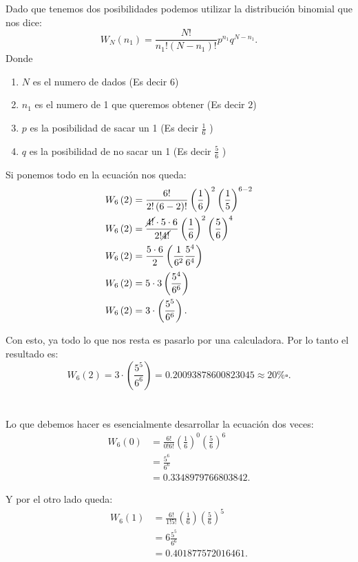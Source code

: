 \documentclass{report}
\begin{document}
Dado que tenemos dos posibilidades podemos utilizar la distribución binomial que nos dice: \[
W_N\left( n_1 \right) = \frac{N!}{n_1!\left( N-n_1 \right)!}p^{n_1}q^{N - n_1}
.\] Donde
\begin{enumerate}
  \item $N$ es el numero de dados (Es decir $6$)
  \item $n_1$ es el numero de 1 que queremos obtener (Es decir $2$)
  \item $p$ es la posibilidad de sacar un 1 (Es decir $\frac{1}{6}$ )
  \item $q$ es la posibilidad de no sacar un 1 (Es decir  $\frac{5}{6}$ )
\end{enumerate}

Si ponemos todo en la ecuación nos queda:
\begin{align*}
  W_6\left( 2 \right) &= \frac{6!}{2!\left( 6 - 2 \right)!}\left( \frac{1}{6} \right) ^{2} \left( \frac{1}{5} \right) ^{6-2} \\
  W_6\left( 2 \right) &= \frac{\cancel{4!}\cdot 5 \cdot 6}{2!\cancel{4!}}\left( \frac{1}{6} \right) ^{2}\left( \frac{5}{6} \right) ^{4} \\
  W_6\left( 2 \right) &= \frac{5 \cdot 6}{2}\left( \frac{1}{6^2} \frac{5^{4}}{6^{4}}\right)  \\
  W_6\left( 2 \right) &= 5 \cdot 3 \left( \frac{5^{4}}{6^{6}} \right)  \\
  W_6\left( 2 \right) &= 3 \cdot \left( \frac{5^{5}}{6^{6}} \right)
.\end{align*}

Con esto, ya todo lo que nos resta es pasarlo por una calculadora. Por lo tanto el resultado es: \[
W_6\left( 2 \right) = 3 \cdot \left( \frac{5^{5}}{6^{6}} \right) = 0.20093878600823045 \approx 20\% \square
.\] 

\section{}

Lo que debemos hacer es esencialmente desarrollar la ecuación dos veces:
\begin{align*}
  W_6\left( 0 \right) &= \frac{6!}{0!6!}\left( \frac{1}{6} \right)^{0}\left( \frac{5}{6}\right)  ^{6} \\
  &= \frac{5^{6}}{6^{6}} \\
  &= 0.3348979766803842
.\end{align*}

Y por el otro lado queda:
\begin{align*}
  W_6\left( 1 \right) &= \frac{6!}{1!5!}\left( \frac{1}{6} \right) \left( \frac{5}{6} \right)^{5} \\
  &= 6 \frac{5^{5}}{6^{6}} \\
  &= 0.401877572016461
.\end{align*}
\end{document}
